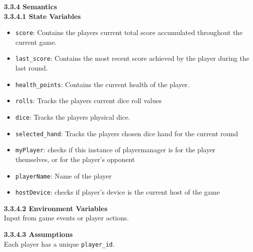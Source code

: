 \documentclass[12pt, titlepage]{article}
\begin{document}
\noindent \textbf{3.3.4 Semantics}\\
\textbf{3.3.4.1 State Variables}\\
\begin{itemize}
    \item \texttt{score}: Contains the players current total score accumulated throughout the current game.
    \item \texttt{last\_score}: Contains the most recent score achieved by the player during the last round.
    \item \texttt{health\_points}: Contains the current health of the player.
    \item \texttt{rolls}: Tracks the players current dice roll values
    \item \texttt{dice}: Tracks the players physical dice.
    \item \texttt{selected\_hand}: Tracks the players chosen dice hand for the current round 
    \item \texttt{myPlayer}: checks if this instance of playermanager is for the player themselves, or for the player's opponent
    \item \texttt{playerName}: Name of the player
    \item \texttt{hostDevice}: checks if player's device is the current host of the game
\end{itemize}

\textbf{3.3.4.2 Environment Variables}\\
Input from game events or player actions.

\textbf{3.3.4.3 Assumptions}\\
Each player has a unique \texttt{player\_id}.
\end{document}
